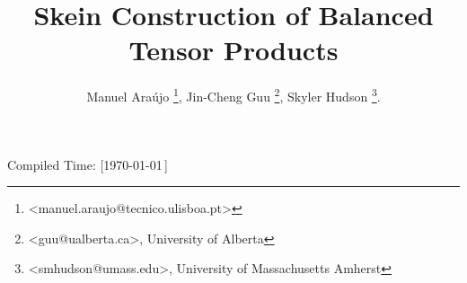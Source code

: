 \title{\vspace{-30pt} Skein Construction of Balanced Tensor Products}
\author{
  Manuel Ara\'{u}jo \thanks{<manuel.araujo@tecnico.ulisboa.pt>},
  Jin-Cheng Guu \thanks{<guu@ualberta.ca>, University of Alberta},
  Skyler Hudson \thanks{<smhudson@umass.edu>, University of Massachusetts Amherst}.
}
\date{}

\newcommand{\III}[9]{%
  {}^{#1}_{#2} I^{#3}_{#4}
  \left(
    \begin{matrix}
      #5 \\ {}\\ #6
    \end{matrix}
    \,\middle|\,
    \begin{matrix}
      #7 \\ #8 \\ #9
    \end{matrix}
  \right)
}
\newcommand{\II}[7]{%
  {}^{#1}_{#2} I^{#3}_{#4}
  \left( #5, #6
    \,\middle|\,
    #7
  \right)
}



\maketitle

\vspace{-30pt}


\begin{flushright}
  \tiny{Compiled Time: [\today\,\DTMcurrenttime]}
\end{flushright}

\vspace{-25pt}
\tableofcontents

